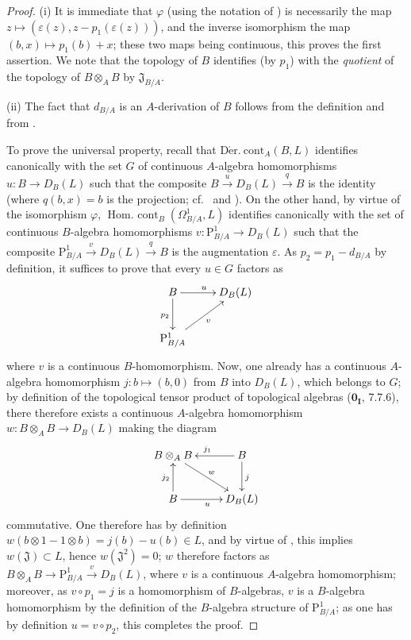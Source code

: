 \begin{proof}
(i) It is immediate that $\varphi$ (using the notation of ) is necessarily the map $z\mapsto(\varepsilon(z),z-p_1(\varepsilon(z)))$, and the inverse isomorphism the map $(b,x)\mapsto p_1(b)+x$; these two maps being continuous, this proves the first assertion.
We note that the topology of $B$ identifies (by $p_1$) with the \emph{quotient} of the topology of $B\otimes_A B$ by $\mathfrak{J}_{B/A}$.

(ii) The fact that $d_{B/A}$ is an $A$-derivation of $B$ follows from the definition  and from .

  To prove the universal property, recall that $\operatorname{D\acute{e}r.\ cont}_A(B,L)$ identifies canonically with the set $G$ of continuous $A$-algebra homomorphisms $u:B\to D_B(L)$ such that the composite $B\xrightarrow{u}D_B(L)\xrightarrow{q}B$ is the identity (where $q(b,x)=b$ is the projection; cf.\  and ).
On the other hand, by virtue of the isomorphism $\varphi$, $\operatorname{Hom.\ cont}_B(\Omega^1_{B/A},L)$ identifies canonically with the set of continuous $B$-algebra homomorphisms $v:\mathrm{P}^1_{B/A}\to D_B(L)$ such that the composite $\mathrm{P}^1_{B/A}\xrightarrow{v}D_B(L)\xrightarrow{q}B$ is the augmentation $\varepsilon$.
As $p_2=p_1-d_{B/A}$ by definition, it suffices to prove that every $u\in G$ factors as
\[
\xymatrix{
  B \ar[r]^u \ar[d]_{p_2} & D_B(L) \\
  \mathrm{P}^1_{B/A} \ar[ur]_v &
}
\]
where $v$ is a continuous $B$-homomorphism.
Now, one already has a continuous $A$-algebra homomorphism $j:b\mapsto(b,0)$ from $B$ into $D_B(L)$, which belongs to $G$; by definition of the topological tensor product of topological algebras ($\mathbf{0_I}$, 7.7.6), there therefore exists a continuous $A$-algebra homomorphism $w:B\otimes_A B\to D_B(L)$ making the diagram
\[
\xymatrix{
  B\otimes_A B \ar[dr]^w & B \ar[l]_{j_1} \ar[d]^j \\
  B \ar[u]^{j_2} \ar[r]_u & D_B(L)
}
\]
commutative.
\mbox{One} therefore has by definition $w(b\otimes 1-1\otimes b)=j(b)-u(b)\in L$, and by virtue of , this implies $w(\mathfrak{J})\subset L$, hence $w(\mathfrak{J}^2)=0$; $w$ therefore factors as $B\otimes_A B\to\mathrm{P}^1_{B/A}\xrightarrow{v}D_B(L)$, where $v$ is a continuous $A$-algebra homomorphism; moreover, as $v\circ p_1=j$ is a homomorphism of $B$-algebras, $v$ is a $B$-algebra homomorphism by the definition of the $B$-algebra structure of $\mathrm{P}^1_{B/A}$; as one has by definition $u=v\circ p_2$, this completes the proof.
\end{proof}

